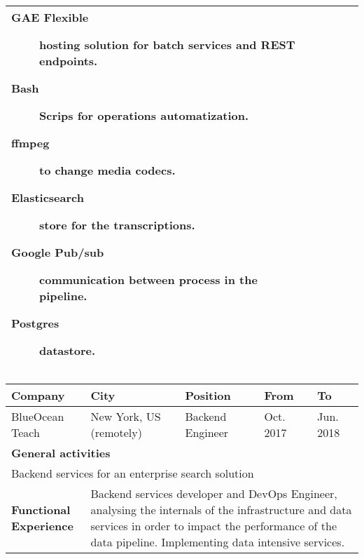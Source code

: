 \begin{cventries}
\begin{tabular}{|p{4.5cm} | p{2cm} | p{4cm} | p{2cm} | p{2cm}|}
{\begin{description}
                      \item[GAE Flexible] hosting solution for batch services and REST endpoints.
                   
                      \item[Bash] Scrips for operations automatization.

                      \item[ffmpeg] to change media codecs.
                      
                      \item[Elasticsearch] store for the transcriptions.
                      
                      \item[Google Pub/sub] communication between process in the pipeline.
                      
                      \item[Postgres] datastore.
                   
                     \end{description}
    } \\


  \hline

\end{tabular}

 \begin{tabular}{|p{4.5cm} | p{2cm} | p{4cm} | p{2cm} | p{2cm}|}
    \hline
    \textbf{Company} & 
    \textbf{City} & 
    \textbf{Position} & 
    \textbf{From} & \textbf{To} \\
    \hline

    BlueOcean Teach & 
    New York, US \hspace{1cm} (remotely) & 
    Backend Engineer & 
    
    Oct. 2017 & Jun. 2018 \\ 
    
    \hline

    \multicolumn{5}{|l|}{\textbf{General activities}} \\

     \multicolumn{5}{|p{15cm}|}{
       Backend services for an enterprise search solution
       } \\
    \hline
    \textbf{Functional Experience} & \multicolumn{4}{p{12cm}|}{
     
     Backend services developer and DevOps Engineer, analysing the internals of the infrastructure and data services in order to impact the performance of the data pipeline. Implementing data intensive services.
      
}
\end{tabular}
\end{cventries}
